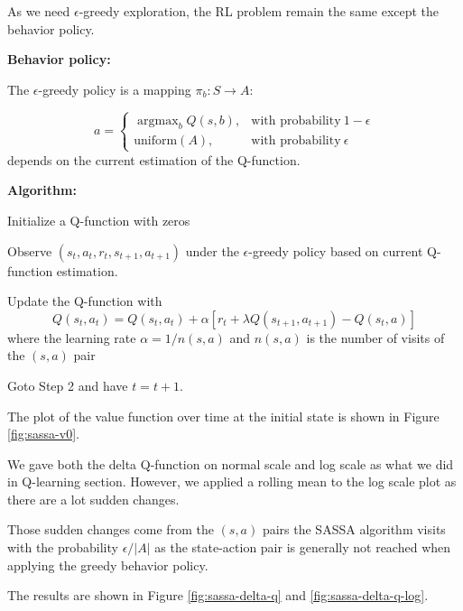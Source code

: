 \documentclass{article}
\DeclareMathOperator*{\argmax}{argmax}
\begin{document}
As we need $\epsilon$-greedy exploration, the RL problem remain the same except
the behavior policy.

\textbf{Behavior policy:}

The $\epsilon$-greedy policy is a mapping $\pi_b: S \rightarrow A $:

\begin{equation*}
  a =
  \begin{cases}
    \argmax_b Q(s, b) ,& \text{with probability} ~ 1 - \epsilon\\
    \text{uniform}(A) ,& \text{with probability} ~ \epsilon
  \end{cases}
\end{equation*}
depends on the current estimation of the Q-function.

\textbf{Algorithm:}
\begin{steps}
  \item Initialize a Q-function with zeros
  \item Observe $(s_t, a_t, r_t, s_{t+1}, a_{t+1})$ under the $\epsilon$-greedy
        policy based on current Q-function estimation.
  \item Update the Q-function with
\begin{equation*}
  Q(s_t, a_t) = Q(s_t, a_t) + \alpha [r_t + \lambda Q(s_{t+1}, a_{t+1}) - Q(s_t, a)]
\end{equation*}
  where the learning rate $\alpha = 1 / n(s, a)$ and $n(s, a)$ is the number of visits
  of the $(s, a)$ pair
  \item Goto Step 2 and have $t = t + 1$.
\end{steps}

The plot of the value function over time at the initial state is shown in Figure
\ref{fig:sassa-v0}.


We gave both the delta Q-function on normal scale and log scale as what we did
in Q-learning section.
However, we applied a rolling mean to the log scale plot as there are a lot
sudden changes.

Those sudden changes come from the $(s, a)$ pairs the SASSA algorithm visits
with the probability $\epsilon / |A|$ as the state-action pair is generally not
reached when applying the greedy behavior policy.

The results are shown in Figure \ref{fig:sassa-delta-q} and \ref{fig:sassa-delta-q-log}.
\end{document}
